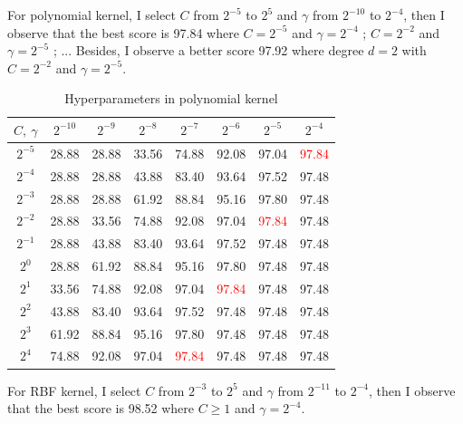 \documentclass{article}
\begin{document}
For polynomial kernel, I select $C$ from $2^{-5}$ to $2^{5}$ and $\gamma$ from $2^{-10}$ to $2^{-4}$, then I observe that the best score is 97.84 where $C=2^{-5}$ and $\gamma=2^{-4}$ ; $C=2^{-2}$ and $\gamma=2^{-5}$ ; ... Besides, I observe a better score  97.92 where degree $d=2$ with $C=2^{-2}$ and $\gamma=2^{-5}$.

\begin{table}[h!]
\begin{center}
\begin{tabular}{ |c|c|c|c|c|c|c|c| } 
 \hline
$C,\ \gamma$ & $2^{-10}$ & $2^{-9}$ &$2^{-8}$ &$2^{-7}$ &$2^{-6}$ &$2^{-5}$ &$2^{-4}$  \\ \hline
$2^{-5}$ & 28.88 & 28.88 & 33.56 & 74.88 & 92.08 & 97.04 & \textcolor{red}{97.84} \\ \hline
$2^{-4}$ & 28.88 & 28.88 & 43.88 & 83.40 & 93.64 & 97.52 & 97.48 \\ \hline 
$2^{-3}$ & 28.88 & 28.88 & 61.92 & 88.84 & 95.16 & 97.80 & 97.48 \\ \hline 
$2^{-2}$ & 28.88 & 33.56 & 74.88 & 92.08 & 97.04 & \textcolor{red}{97.84} & 97.48 \\ \hline 
$2^{-1}$ & 28.88 & 43.88 & 83.40 & 93.64 & 97.52 & 97.48 & 97.48 \\ \hline 
$2^{0}$ & 28.88 & 61.92 & 88.84 & 95.16 & 97.80 & 97.48 & 97.48 \\ \hline 
$2^{1}$ & 33.56 & 74.88 & 92.08 & 97.04 & \textcolor{red}{97.84} & 97.48 & 97.48 \\ \hline 
$2^{2}$ & 43.88 & 83.40 & 93.64 & 97.52 & 97.48 & 97.48 & 97.48 \\ \hline 
$2^{3}$ & 61.92 & 88.84 & 95.16 & 97.80 & 97.48 & 97.48 & 97.48 \\ \hline 
$2^{4}$ & 74.88 & 92.08 & 97.04 & \textcolor{red}{97.84} & 97.48 & 97.48 & 97.48 \\ \hline
\end{tabular}
\end{center}
\caption{Hyperparameters in polynomial kernel}
\label{table}
\end{table}

For RBF kernel, I select $C$ from $2^{-3}$ to $2^5$ and $\gamma$ from $2^{-11}$ to $2^{-4}$, then I observe that the best score is 98.52 where $C \geq 1$ and $\gamma=2^{-4}$.
\end{document}
